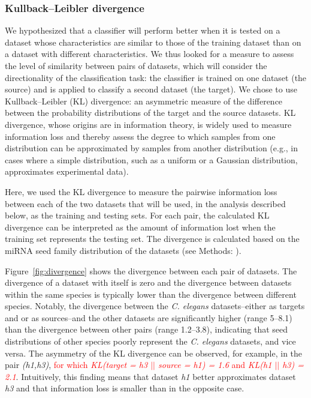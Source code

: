\documentclass{bmcart}
\begin{document}
\subsubsection*{Kullback–Leibler divergence}
We hypothesized that a classifier will perform better when it is tested on a dataset whose characteristics are similar to those of the training dataset than on a dataset with different characteristics.
We thus looked for a measure to assess the level of similarity between pairs of datasets, which will consider the directionality of the classification task: the classifier is trained on one dataset (the source) and is applied to classify a second dataset (the target).
We chose to use Kullback–Leibler (KL) divergence: an asymmetric measure of the difference between the probability distributions of the target and the source datasets. KL divergence, whose origins are in information theory, is widely used to measure information loss and thereby assess the degree to which samples from one distribution can be approximated by samples from another distribution (e.g., in cases where a simple distribution, such as a uniform or a Gaussian distribution, approximates experimental data).

Here, we used the KL divergence to measure the pairwise information loss between each of the two datasets that will be used, in the analysis described below, as the training and testing sets. For each pair, the calculated KL divergence can be interpreted as the amount of information lost when the training set represents the testing set. The divergence is calculated based on the miRNA seed family distribution of the datasets (see Methods: ).

Figure~\ref{fig:divergence} shows the divergence between each pair of datasets. The divergence of a dataset with itself is zero and the divergence between datasets within the same species is typically lower than the divergence between different species. Notably, the divergence between the \textit{C. elegans} datasets--either as targets and or as sources--and the other datasets are significantly higher (range 5--8.1) than the divergence between other pairs (range 1.2--3.8), indicating that seed distributions of other species poorly represent the \textit{C. elegans} datasets, and vice versa. The asymmetry of the KL divergence can be observed, for example, in the pair \textit{(h1,h3)}, \textcolor{red}{for which \textit{KL(target = h3 $||$ source = h1) = 1.6} and \textit{KL(h1 $||$ h3) = 2.1}}. Intuitively, this finding means that dataset \textit{h1} better approximates dataset \textit{h3} and that information loss is smaller than in the opposite case.
\end{document}
